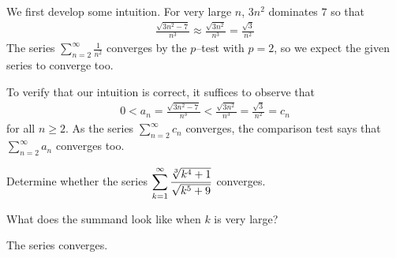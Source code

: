 \begin{solution}
We first develop some intuition. For very large $n$, $3n^2$ dominates $7$ so that
\begin{align*}
\frac{\sqrt{3 n^2 - 7}}{n^3}
\approx \frac{\sqrt{3 n^2}}{n^3}
=\frac{\sqrt{3}}{n^2}
\end{align*}
The series $\displaystyle \sum_{n=2}^{\infty} \frac{1}{n^2}$
converges by the $p$--test with $p=2$, so we expect the given series to converge too.

To verify that  our intuition is correct, it suffices to observe that
\begin{align*}
 0< a_n = \frac{\sqrt{3 n^2 - 7}}{n^3} < \frac{\sqrt{3n^2}}{n^3} = \frac{\sqrt{3}}{n^2} =c_n
\end{align*}
for all $n\ge 2$. As the series $\sum\limits_{n=2}^\infty c_n$ converges,
 the comparison test says that $\sum\limits_{n=2}^\infty a_n$ converges too.

\end{solution}

\begin{question}[M105 2014A]
Determine whether the series
$\displaystyle\sum_{k=1}^\infty\frac{ \root{3}\of{k^4+1} }
                                    {\sqrt{k^5+9}}$
converges.
\end{question}

\begin{hint}
What does the summand look like when $k$ is very large?
\end{hint}

\begin{answer}
The series converges.
\end{answer}

